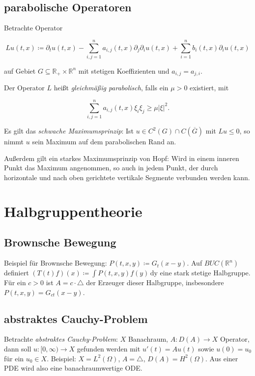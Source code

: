 \documentclass[11pt,a4paper]{scrartcl}
\newcommand{\R}{\mathbb{R}} %
\theoremstyle{plain}
\theoremstyle{definition}
\theoremstyle{remark}
\begin{document}
\subsection{parabolische Operatoren}

Betrachte Operator

$$Lu(t,x)\coloneqq \partial_t u(t,x) -\sum_{i,j=1}^n a_{i,j}(t,x)\partial_j \partial_i u(t,x) + \sum_{i=1}^n b_i(t,x) \partial_i u(t,x)$$

auf Gebiet $G\subseteq \R_+ \times \R^n$ mit stetigen Koeffizienten und $a_{i,j}=a_{j,i}$.

Der Operator $L$ heißt \emph{gleichmäßig parabolisch}, falls ein $\mu > 0$ existiert, mit

$$\sum_{i,j=1}^n a_{i,j}(t,x)\xi_i\xi_j \geq \mu |\xi|^2.$$

Es gilt das \emph{schwache Maximumsprinzip}: Ist $u\in C^2(G) \cap C(\overline{G})$ mit $Lu \leq 0$, so nimmt $u$ sein Maximum auf dem parabolischen Rand an.

Außerdem gilt ein starkes Maximumsprinzip von Hopf: Wird in einem inneren Punkt das Maximum angenommen, so auch in jedem Punkt, der durch horizontale und nach oben gerichtete vertikale Segmente verbunden werden kann.

\section{Halbgruppentheorie}

\subsection{Brownsche Bewegung}

Beispiel für Brownsche Bewegung: $P(t,x,y)\coloneqq G_t(x-y)$. Auf $BUC(\R^n)$ definiert $(T(t)f)(x)\coloneqq \int P(t,x,y)f(y) \, \mathrm{dy}$ eine stark stetige Halbgruppe. Für ein $c > 0$ ist $A=c\cdot\triangle$ der Erzeuger dieser Halbgruppe, insbesondere $P(t,x,y) = G_{ct}(x-y)$.

\subsection{abstraktes Cauchy-Problem}

Betrachte \emph{abstraktes Cauchy-Problem}: $X$ Banachraum, $A:D(A) \to X$ Operator, dann soll $u: [0,\infty) \to X$ gefunden werden mit $u'(t) = Au(t)$ sowie $u(0)=u_0$ für ein $u_0\in X$. Beispiel: $X=L^2(\Omega)$, $A=\triangle$, $D(A)=H^2(\Omega)$. Aus einer PDE wird also eine banachraumwertige ODE.
\end{document}
